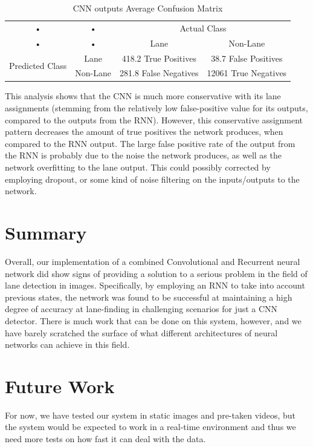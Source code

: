 \documentclass[runningheads]{llncs}
\begin{document}
\begin{table}[H]
\centering
\caption{CNN outputs Average Confusion Matrix}\label{tab:2}
\begin{tabular}{cccc}
\cline{3-4}
• & • & \multicolumn{2}{c}{Actual Class} \\
• & • & Lane & Non-Lane \\ 
\hline 
\multirow{2}{*}{Predicted Class} & Lane & 418.2 True Positives & 38.7 False Positives \\ 
• & Non-Lane & 281.8 False Negatives & 12061 True Negatives \\ 
\hline 
\end{tabular} 
\end{table}

This analysis shows that the CNN is much more conservative with its lane assignments (stemming from the relatively low false-positive value for its outputs, compared to the outputs from the RNN). However, this conservative assignment pattern decreases the amount of true positives the network produces, when compared to the RNN output. The large false positive rate of the output from the RNN is probably due to the noise the network produces, as well as the network overfitting to the lane output. This could possibly corrected by employing dropout, or some kind of noise filtering on the inputs/outputs to the network.

\section{Summary}
Overall, our implementation of a combined Convolutional and Recurrent neural network did show signs of providing a solution to a serious problem in the field of lane detection in images. Specifically, by employing an RNN to take into account previous states, the network was found to be successful at maintaining a high degree of accuracy at lane-finding in challenging scenarios for just a CNN detector. There is much work that can be done on this system, however, and we have barely scratched the surface of what different architectures of neural networks can achieve in this field.

\section{Future Work}
For now, we have tested our system in static images and pre-taken videos, but the system would be expected to work in a real-time environment and thus we need more tests on how fast it can deal with the data. \\
\end{document}
